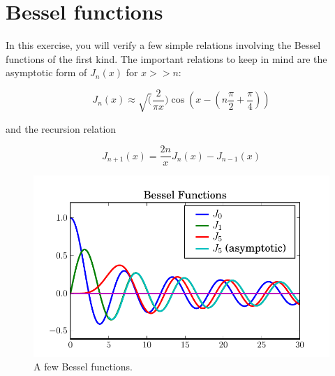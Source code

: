 \section{Bessel functions}
\label{sec:bessel}

In this exercise, you will verify a few simple relations involving the Bessel
functions of the first kind.  The important relations to keep in mind are the
asymptotic form of $J_n(x)$ for $x>>n$:

\begin{equation}
J_n(x) \approx \sqrt(\frac{2}{\pi x})\cos(x-(n\frac{\pi}{2}+\frac{\pi}{4}))
\end{equation}

%
and the recursion relation

\begin{equation}
J_{n+1}(x) = \frac{2n}{x} J_n(x)-J_{n-1}(x)
\end{equation}

\begin{figure}
\begin{centering}
\includegraphics[width=5in]{fig/bessel_functions}
\par
\end{centering}


\caption{\label{fig:bessel_functions}A few Bessel functions.}

\end{figure}



